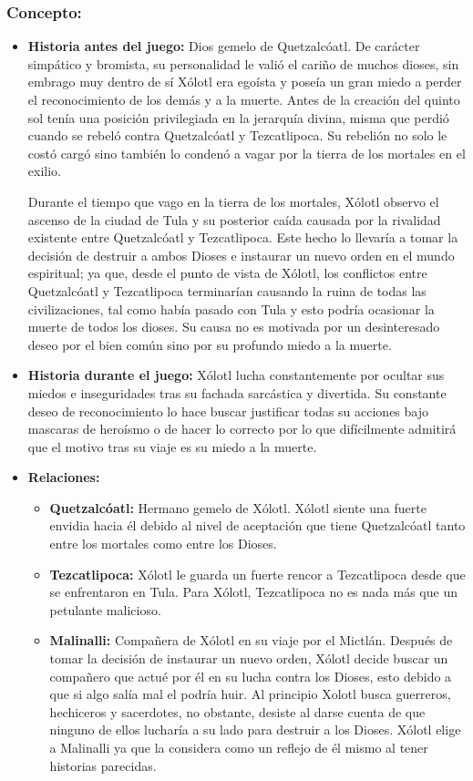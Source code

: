\documentclass[11pt,letterpaper]{article}
\begin{document}
\subsubsection{Concepto:}
\begin{itemize}
	\item \textbf{Historia antes del juego:}
	Dios gemelo de Quetzalcóatl. De carácter simpático y bromista, su personalidad le valió el cariño de muchos dioses, sin embrago muy dentro de sí Xólotl era egoísta y poseía un gran miedo a perder el reconocimiento de los demás y a la muerte. Antes de la creación del quinto sol tenía una posición privilegiada en la jerarquía divina, misma que perdió cuando se rebeló contra Quetzalcóatl y Tezcatlipoca. Su rebelión no solo le costó cargó sino también lo condenó a vagar por la tierra de los mortales en el exilio.
	\\ 
	\par 
	Durante el tiempo que vago en la tierra de los mortales, Xólotl observo el ascenso de la ciudad de Tula  y su posterior caída causada por la rivalidad existente entre Quetzalcóatl y Tezcatlipoca. Este hecho lo llevaría a tomar la decisión de destruir a ambos Dioses e instaurar un nuevo orden en el mundo espiritual; ya que, desde el punto de vista de Xólotl, los conflictos entre Quetzalcóatl y Tezcatlipoca terminarían causando la ruina de todas las civilizaciones, tal como había pasado con Tula y esto podría ocasionar la muerte de todos los dioses. Su causa no es motivada por un desinteresado deseo por el bien común sino por su profundo miedo a la muerte. 
	\item \textbf{Historia durante el juego:}
	Xólotl lucha constantemente por ocultar sus miedos e inseguridades tras su fachada sarcástica y divertida. Su constante deseo de reconocimiento lo hace buscar justificar todas su acciones bajo mascaras de heroísmo o de hacer lo correcto por lo que difícilmente admitirá que el motivo tras su viaje es su miedo a la muerte. 
	\item \textbf{Relaciones:}
	\begin{itemize}
		\item \textbf{Quetzalcóatl:} Hermano gemelo de Xólotl. Xólotl siente una fuerte envidia hacia él debido al nivel de aceptación que tiene Quetzalcóatl tanto entre los mortales como entre los Dioses.
		\item \textbf{Tezcatlipoca:} Xólotl le guarda un fuerte rencor a Tezcatlipoca desde que se enfrentaron en Tula. Para Xólotl, Tezcatlipoca no es nada más que un petulante malicioso. 
		\item \textbf{Malinalli:} Compañera de Xólotl en su viaje por el Mictlán. Después de tomar la decisión de instaurar un nuevo orden, Xólotl decide buscar un compañero que actué por él en su lucha contra los Dioses, esto debido a que si algo salía mal el podría huir. Al principio Xolotl busca guerreros, hechiceros y sacerdotes, no obstante, desiste al darse cuenta de que ninguno de ellos lucharía a su lado para destruir a los Dioses. Xólotl elige a Malinalli ya que la considera como un reflejo de él mismo al tener historias parecidas.
	\end{itemize}			  
\end{itemize}
\end{document}
